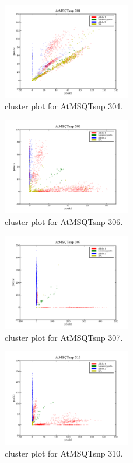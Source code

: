 \begin{figure}[H]
\includegraphics[width=0.5\textwidth]{figures/cluster_plot_AtMSQTsnp_304.png}
\caption{cluster plot for AtMSQTsnp 304.} \label{flAtMSQTsnp304}
\end{figure}
\begin{figure}[H]
\includegraphics[width=0.5\textwidth]{figures/cluster_plot_AtMSQTsnp_306.png}
\caption{cluster plot for AtMSQTsnp 306.} \label{flAtMSQTsnp306}
\end{figure}
\begin{figure}[H]
\includegraphics[width=0.5\textwidth]{figures/cluster_plot_AtMSQTsnp_307.png}
\caption{cluster plot for AtMSQTsnp 307.} \label{flAtMSQTsnp307}
\end{figure}
\begin{figure}[H]
\includegraphics[width=0.5\textwidth]{figures/cluster_plot_AtMSQTsnp_310.png}
\caption{cluster plot for AtMSQTsnp 310.} \label{flAtMSQTsnp310}
\end{figure}
